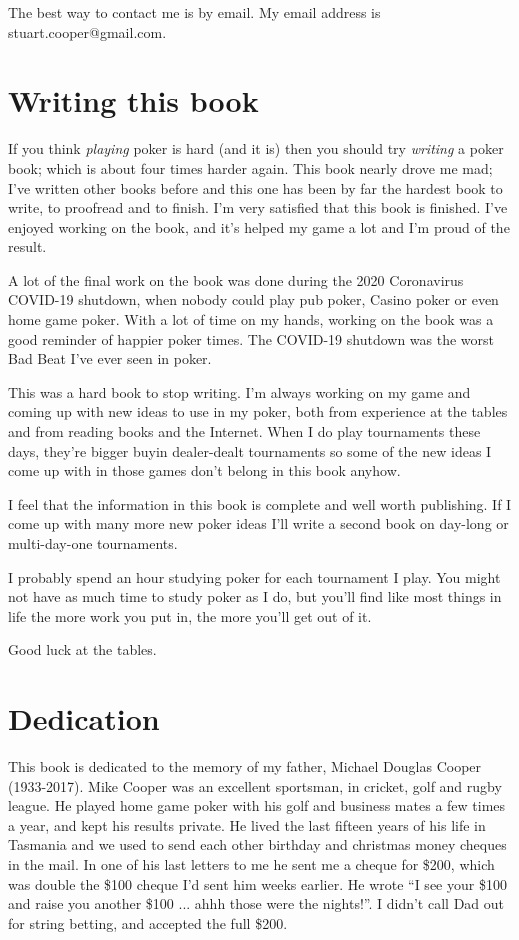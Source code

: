 The best way to contact me is by email. My email address
is stuart.cooper@gmail.com.

\section{Writing this book}

If you think \textit{playing} poker is hard (and it is) then you should try
\textit{writing} a poker book; which is about four times harder
again. This book nearly drove me mad; I've written other books before
and this one has been by far the hardest book to write, to proofread
and to finish. I'm very satisfied that this book is finished. I've
enjoyed working on the book, and it's helped my game a lot and I'm
proud of the result.

A lot of the final work on the book was done during the 2020
Coronavirus COVID-19 shutdown, when nobody could play pub poker,
Casino poker or even home game poker. With a lot of time on my hands,
working on the book was a good reminder of happier poker times. The
COVID-19 shutdown was the worst Bad Beat I've ever seen in poker.

This was a hard book to stop writing. I'm always working on my game
and coming up with new ideas to use in my poker, both from experience
at the tables and from reading books and the Internet. When I do play
tournaments these days, they're bigger buyin dealer-dealt tournaments
so some of the new ideas I come up with in those games don't belong in
this book anyhow.

I feel that the information in this book is complete and well worth
publishing. If I come up with many more new poker ideas I'll write
a second book on day-long or multi-day-one tournaments.

I probably spend an hour studying poker for each tournament I play.
You might not have as much time to study poker as I do, but you'll
find like most things in life the more work you put in, the
more you'll get out of it.

Good luck at the tables.

\section{Dedication}

This book is dedicated to the memory of my father,
Michael Douglas Cooper (1933-2017). Mike Cooper was an excellent
sportsman, in cricket, golf and rugby league. He played home game
poker with his golf and business mates a few times a year, and kept
his results private. He lived the last fifteen years of his life in
Tasmania and we used to send each other birthday and christmas money
cheques in the mail. In one of his last letters to me he sent me a
cheque for \$200, which was double the \$100 cheque I'd sent him weeks
earlier. He wrote ``I see your \$100 and raise you another \$100
... ahhh those were the nights!''. I didn't call Dad out for string
betting, and accepted the full \$200.

